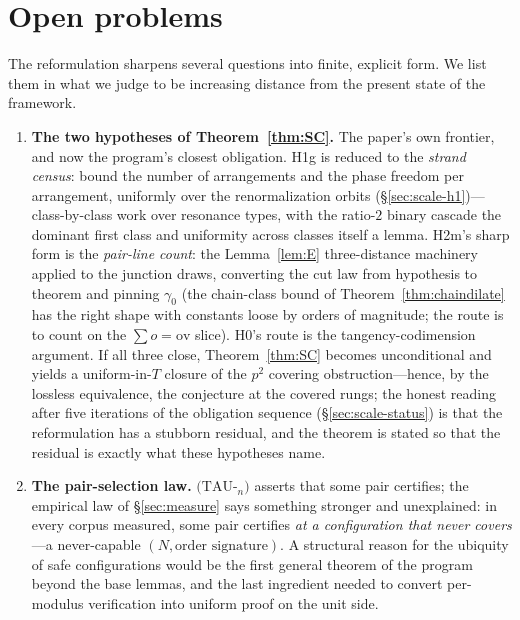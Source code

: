 
\section{Open problems}\label{sec:open}

The reformulation sharpens several questions into finite, explicit form.
We list them in what we judge to be increasing distance from the present
state of the framework.

\begin{enumerate}[leftmargin=1.7em,itemsep=4pt]

\item \textbf{The two hypotheses of Theorem~\ref{thm:SC}.} The paper's
  own frontier, and now the program's closest obligation. H1g is reduced
  to the \emph{strand census}: bound the number of arrangements and the
  phase freedom per arrangement, uniformly over the renormalization
  orbits (\S\ref{sec:scale-h1})---class-by-class work over resonance
  types, with the ratio-$2$ binary cascade the dominant first class and
  uniformity across classes itself a lemma. H2m's sharp form is the
  \emph{pair-line count}: the Lemma~\ref{lem:E} three-distance
  machinery applied to the junction draws, converting the cut law from
  hypothesis to theorem and pinning $\gamma_0$ (the chain-class bound of
  Theorem~\ref{thm:chaindilate} has the right shape with constants loose
  by orders of magnitude; the route is to count on the
  $\sum o=\mathrm{ov}$ slice). H0's route is the tangency-codimension
  argument. If all three close, Theorem~\ref{thm:SC} becomes
  unconditional and yields a uniform-in-$T$ closure of the $p^2$
  covering obstruction---hence, by the lossless equivalence, the
  conjecture at the covered rungs; the honest reading after five
  iterations of the obligation sequence (\S\ref{sec:scale-status}) is
  that the reformulation has a stubborn residual, and the theorem is
  stated so that the residual is exactly what these hypotheses name.

\item \textbf{The pair-selection law.} $(\mathrm{TAU}$-$_n)$ asserts that
  some pair certifies; the empirical law of \S\ref{sec:measure} says
  something stronger and unexplained: in every corpus measured, some pair
  certifies \emph{at a configuration that never covers}---a never-capable
  $(N,\text{order signature})$. A structural reason for the ubiquity of
  safe configurations would be the first general theorem of the program
  beyond the base lemmas, and the last ingredient needed to convert
  per-modulus verification into uniform proof on the unit side.


\end{enumerate}
